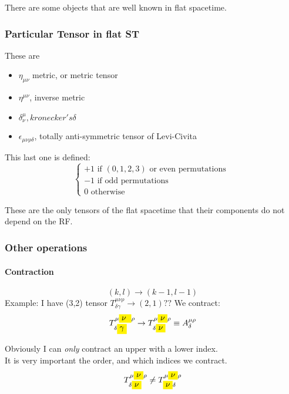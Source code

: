 There are some objects that are well known in flat spacetime.
\subsubsection{Particular Tensor in flat ST}
These are
\begin{itemize}
	\item $\eta_{\mu  \nu }$ metric, or metric tensor
	\item $\eta^{\mu \nu }$, inverse metric
	\item $\delta^{\mu }_{\nu }, kronecker's \delta $
	\item $\epsilon_{\mu \nu \rho \delta }$, totally anti-symmetric tensor of Levi-Civita
\end{itemize}

This last one is defined:
\begin{equation}
\begin{cases}
+1 \text{ if } \left( 0,1,2,3 \right) \text{ or even permutations } \\
-1 \text{ if  odd permutations} \\
0 \text{ otherwise }
\end{cases}
\end{equation}

These are the only tensors of the flat spacetime that their components do not depend on the RF. \par

\subsubsection{Other operations}
\paragraph{Contraction} \[
	\left( k,l \right) \to \left( k-1, l-1 \right)
\]
Example: I have (3,2) tensor $T^{\mu \nu \rho }_{\delta \gamma } \to \left( 2,1 \right) ??$
We contract:
\[
	T^{\mu \colorbox{yellow}{$\nu$ } \rho  }_{\delta \colorbox{yellow}{$\gamma$} } \to T^{\mu  \colorbox{yellow}{$ \nu   $} \rho }_{\delta \colorbox{yellow}{$ \nu   $} } \equiv A^{\mu  \rho }_{\delta } 
\]

Obviously I can \emph{only} contract an upper with a lower index. \\
It is very important the order, and which indices we contract.
\[
T^{\mu  \colorbox{yellow}{$ \nu   $} \rho }_{\delta  \colorbox{yellow}{$ \nu   $} } \neq T^{\mu  \colorbox{yellow}{$ \nu   $} \rho }_{ \colorbox{yellow}{$ \nu   $} \delta  }
\]

